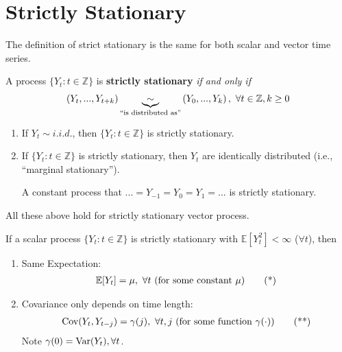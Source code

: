 \documentclass[11pt]{elegantbook}
\begin{document}
\section{Strictly Stationary}
The definition of strict stationary is the same for both scalar and vector time series.
\begin{definition}
    A process $\{Y_t:t\in \mathbb{Z}\}$ is \textbf{strictly stationary} \textit{if and only if}
    \begin{equation}
        \begin{aligned}
            \left(Y_t,...,Y_{t+k}\right)\underbrace{\sim}_\textnormal{``is distributed as''} \left(Y_0,...,Y_{k}\right),\ \forall t\in \mathbb{Z},k\geq 0
        \end{aligned}
        \nonumber
    \end{equation}
\end{definition}
\begin{note}
    \begin{enumerate}
        \item If $Y_t\sim i.i.d.$, then $\{Y_t:t\in \mathbb{Z}\}$ is strictly stationary.
        \item If $\{Y_t:t\in \mathbb{Z}\}$ is strictly stationary, then $Y_t$ are identically distributed (i.e., ``marginal stationary'').
        \begin{example}
            A constant process that $...=Y_{-1}=Y_0=Y_1=...$ is strictly stationary.
        \end{example}
    \end{enumerate}
    All these above hold for strictly stationary vector process.
\end{note}

\begin{lemma}
    If a scalar process $\{Y_t:t\in \mathbb{Z}\}$ is strictly stationary with $\mathbb{E}[Y_t^2]<\infty$ ($\forall t$), then
    \begin{enumerate}
        \item Same Expectation:
        \begin{equation}
            \begin{aligned}
                \mathbb{E}[Y_t]=\mu,\ \forall t \textnormal{ (for some constant $\mu$)}
            \end{aligned}
            \label{s}
            \tag{*}
        \end{equation}
        \item Covariance only depends on time length:
        \begin{equation}
            \begin{aligned}
                \textnormal{Cov}(Y_t,Y_{t-j})=\gamma(j),\ \forall t,j \textnormal{ (for some function $\gamma(\cdot)$)}
            \end{aligned}
            \label{ss}
            \tag{**}
        \end{equation}
        Note $\gamma(0)= \textnormal{Var}(Y_t),\forall t$.
    \end{enumerate}
\end{lemma}
\end{document}
